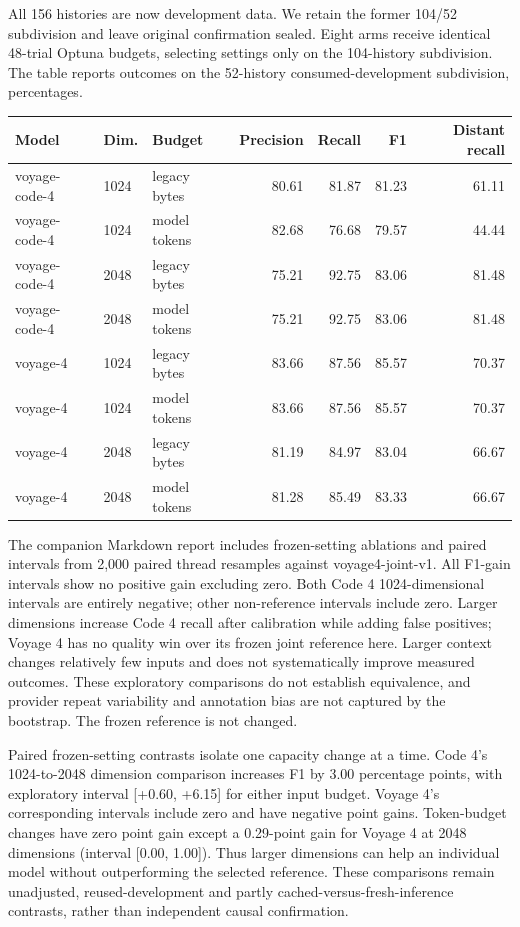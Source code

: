 All 156 histories are now development data. We retain the former 104/52 subdivision
and leave original confirmation sealed. Eight arms receive identical 48-trial
Optuna budgets, selecting settings only on the 104-history subdivision. The table
reports outcomes on the 52-history consumed-development subdivision, percentages.
\begin{center}\scriptsize
\begin{tabular}{ll l rrrr}
\toprule
Model & Dim. & Budget & Precision & Recall & F1 & Distant recall\\
\midrule
voyage-code-4 & 1024 & legacy bytes & 80.61 & 81.87 & 81.23 & 61.11 \\
voyage-code-4 & 1024 & model tokens & 82.68 & 76.68 & 79.57 & 44.44 \\
voyage-code-4 & 2048 & legacy bytes & 75.21 & 92.75 & 83.06 & 81.48 \\
voyage-code-4 & 2048 & model tokens & 75.21 & 92.75 & 83.06 & 81.48 \\
voyage-4 & 1024 & legacy bytes & 83.66 & 87.56 & 85.57 & 70.37 \\
voyage-4 & 1024 & model tokens & 83.66 & 87.56 & 85.57 & 70.37 \\
voyage-4 & 2048 & legacy bytes & 81.19 & 84.97 & 83.04 & 66.67 \\
voyage-4 & 2048 & model tokens & 81.28 & 85.49 & 83.33 & 66.67 \\
\bottomrule
\end{tabular}
\end{center}
The companion Markdown report includes frozen-setting ablations and paired
intervals from 2,000 paired thread resamples against voyage4-joint-v1. All F1-gain
intervals show no positive gain excluding zero. Both Code 4 1024-dimensional
intervals are entirely negative; other non-reference intervals include zero.
Larger dimensions increase Code 4 recall after calibration
while adding false positives; Voyage 4 has no quality win over its frozen joint
reference here. Larger context changes relatively few inputs and does not
systematically improve measured outcomes. These exploratory comparisons do not
establish equivalence, and provider repeat variability and annotation bias are
not captured by the bootstrap. The frozen reference is not changed.

Paired frozen-setting contrasts isolate one capacity change at a time.
Code 4's 1024-to-2048 dimension comparison increases F1 by 3.00 percentage
points, with exploratory interval [+0.60, +6.15] for either input budget.
Voyage 4's corresponding intervals include zero and have negative point gains.
Token-budget changes have zero point gain except a 0.29-point gain for Voyage 4
at 2048 dimensions (interval [0.00, 1.00]). Thus larger dimensions can help an
individual model without outperforming the selected reference. These comparisons
remain unadjusted, reused-development and partly cached-versus-fresh-inference
contrasts, rather than independent causal confirmation.

